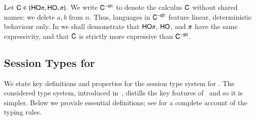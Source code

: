 \documentclass[preprint,11pt]{elsarticle}
\begin{document}
{\begin{enumerate}[$\bullet$]
\end{enumerate}
%
Let $\mathsf{C} \in \{\mathsf{HO}\pi, \mathsf{HO}, \pi\}$. We write 
$\mathsf{C}^{-\mathsf{sh}}$ to denote the calculus $\mathsf{C}$ without shared names:
we delete $a,b$ from $n$. 
Thus, languages in $\mathsf{C}^{-\mathsf{sh}}$ feature linear, deterministic behaviour only.
In 
we shall demonstrate that 
$\mathsf{HO}\pi$, $\mathsf{HO}$, and $\pi$ have the same expressivity,
and that $\mathsf{C}$ is strictly more expressive than $\mathsf{C}^{-\mathsf{sh}}$.



\subsection{Session Types for \HOp}
\label{sec:types}

We state key definitions and properties for the session type system for \HOp.
The considered type system,
introduced in~\cite{KouzapasPY17},
 distills the key features of~\cite{tlca07,MostrousY15} and so it is simpler.
 Below we provide essential definitions; see  
for a complete account of the typing rules.




}
\end{document}
